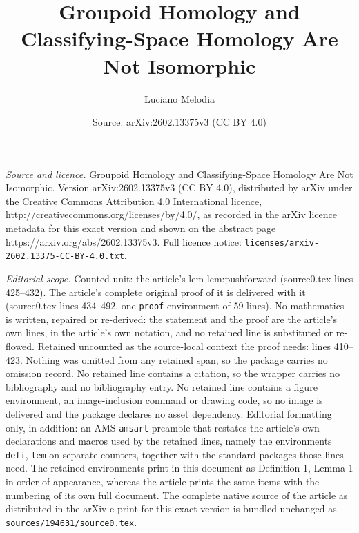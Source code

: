\documentclass[10pt,a4paper]{amsart}
\title{Groupoid Homology and Classifying-Space Homology Are Not Isomorphic}
\author{Luciano Melodia}
\date{Source: arXiv:2602.13375v3 (CC BY 4.0)}
\begin{document}
\maketitle

\noindent\emph{Source and licence.} Groupoid Homology and Classifying-Space Homology Are Not Isomorphic. Version arXiv:2602.13375v3 (CC BY 4.0), distributed by arXiv under the Creative Commons Attribution 4.0 International licence, http://creativecommons.org/licenses/by/4.0/, as recorded in the arXiv licence metadata for this exact version and shown on the abstract page https://arxiv.org/abs/2602.13375v3. Full licence notice: \texttt{licenses/arxiv-2602.13375-CC-BY-4.0.txt}.\par\smallskip

\noindent\textit{Editorial scope.} Counted unit: the article's lem lem:pushforward (source0.tex lines 425--432). The article's complete original proof of it is delivered with it (source0.tex lines 434--492, one \texttt{proof} environment of 59 lines). No mathematics is written, repaired or re-derived: the statement and the proof are the article's own lines, in the article's own notation, and no retained line is substituted or re-flowed.  Retained uncounted as the source-local context the proof needs: lines 410--423.  Nothing was omitted from any retained span, so the package carries no omission record.  No retained line contains a citation, so the wrapper carries no bibliography and no bibliography entry.  No retained line contains a figure environment, an image-inclusion command or drawing code, so no image is delivered and the package declares no asset dependency.  Editorial formatting only, in addition: an AMS \texttt{amsart} preamble that restates the article's own declarations and macros used by the retained lines, namely the environments \texttt{defi}, \texttt{lem} on separate counters, together with the standard packages those lines need.  The retained environments print in this document as Definition 1, Lemma 1 in order of appearance, whereas the article prints the same items with the numbering of its own full document.  The complete native source of the article as distributed in the arXiv e-print for this exact version is bundled unchanged as \texttt{sources/194631/source0.tex}.
\end{document}

